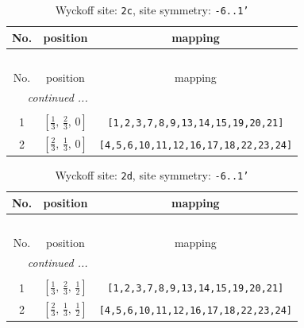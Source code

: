 \documentclass[fleqn,8pt]{jsarticle}
\begin{document}
\begin{longtable}{ccc}
\caption{Wyckoff site: {\tt 2c}, site symmetry: {\tt -6..1'}}
 \\
 \hline \hline
No. & position & mapping \\ \hline \endfirsthead

\multicolumn{2}{l}{\tablename\ \thetable{}} \\
 \hline \hline
No. & position & mapping \\ \hline \endhead

 \hline \hline
\multicolumn{2}{r}{\footnotesize\it continued ...} \\ \endfoot

 \hline \hline
\multicolumn{2}{r}{} \\ \endlastfoot

1 & $\left[ \frac{1}{3},\, \frac{2}{3},\, 0 \right]$ & {\tt [1,2,3,7,8,9,13,14,15,19,20,21]} \\ \hline
2 & $\left[ \frac{2}{3},\, \frac{1}{3},\, 0 \right]$ & {\tt [4,5,6,10,11,12,16,17,18,22,23,24]} \\
\end{longtable}
\renewcommand{\arraystretch}{1.2}
\begin{longtable}{ccc}
\caption{Wyckoff site: {\tt 2d}, site symmetry: {\tt -6..1'}}
 \\
 \hline \hline
No. & position & mapping \\ \hline \endfirsthead

\multicolumn{2}{l}{\tablename\ \thetable{}} \\
 \hline \hline
No. & position & mapping \\ \hline \endhead

 \hline \hline
\multicolumn{2}{r}{\footnotesize\it continued ...} \\ \endfoot

 \hline \hline
\multicolumn{2}{r}{} \\ \endlastfoot

1 & $\left[ \frac{1}{3},\, \frac{2}{3},\, \frac{1}{2} \right]$ & {\tt [1,2,3,7,8,9,13,14,15,19,20,21]} \\ \hline
2 & $\left[ \frac{2}{3},\, \frac{1}{3},\, \frac{1}{2} \right]$ & {\tt [4,5,6,10,11,12,16,17,18,22,23,24]} \\
\end{longtable}
\renewcommand{\arraystretch}{1.2}
\end{document}
